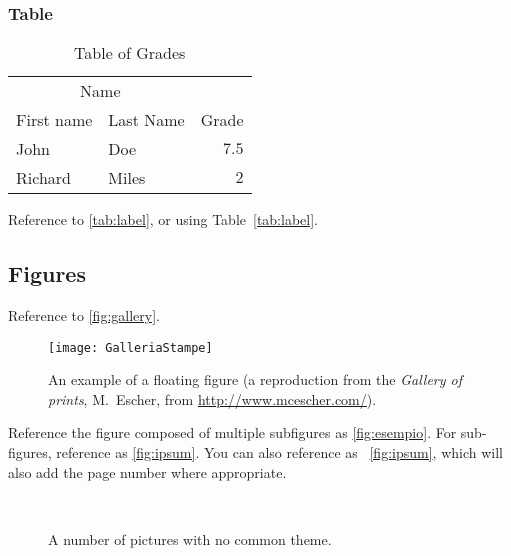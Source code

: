 \subsubsection{Table}

\lipsum[13] %

\begin{table}[hbt]
\caption{Table of Grades}
\centering
\begin{tabular}{llr}
\toprule
\multicolumn{2}{c}{Name} \\
\cmidrule(r){1-2}
First name & Last Name & Grade \\
\midrule
John & Doe & $7.5$ \\
Richard & Miles & $2$ \\
\bottomrule
\end{tabular}
\label{tab:label}
\end{table}

Reference to \autoref{tab:label}, or using Table~\vref{tab:label}.



\subsection{Figures}
\label{sec:instructions:figures}

Reference to \autoref{fig:gallery}.

\begin{figure}[tb]
\centering
\texttt{[image: GalleriaStampe]}
\caption[An example of a floating figure]{
  An example of a floating figure (a reproduction from the
  \emph{Gallery of prints}, M.~Escher,
  from \url{http://www.mcescher.com/}).
}
\label{fig:gallery}
\end{figure}

Reference the figure composed of multiple subfigures as \autoref{fig:esempio}.
For sub-figures, reference as \autoref{fig:ipsum}.
You can also reference as \figureautorefname~\vref{fig:ipsum},
which will also add the page number where appropriate.

\lipsum[5-8] %

\begin{figure}[tb]
\centering
{} \quad
{} \\
 \quad
{}
\caption[A number of pictures.]{A number of pictures with no common theme.} %
\label{fig:esempio}
\end{figure}

